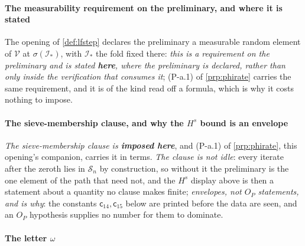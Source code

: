 \paragraph{The measurability requirement on the preliminary, and where it is stated}

The opening of \cref{def:lfstep} declares the preliminary a measurable random element of $\mathcal V$
at $\sigma(\mathcal I_\ast)$, with $\mathcal I_\ast$ the fold fixed there: \emph{this is a requirement on the preliminary and
is stated \textbf{here}, where the preliminary is declared, rather than only inside the verification that
consumes it}; (P-a.1) of \cref{prp:phirate} carries the same requirement, and it is of the kind read off
a formula, which is why it costs nothing to impose.

\paragraph{The sieve-membership clause, and why the $H^{s}$ bound is an envelope}

\emph{The sieve-membership clause is \textbf{imposed here}}, and (P-a.1) of \cref{prp:phirate}, this
opening's companion, carries it in terms. \emph{The clause is not idle}: every iterate after the zeroth
lies in $\mathcal S_n$
by construction, so without it the preliminary is the one element of the path that need not, and the
$H^{s}$ display above is then a statement about a quantity no clause makes finite; \emph{envelopes, not $O_P$
statements, and  is why}: the constants $\mathsf c_{14},\mathsf c_{15}$ below are
printed before the data are seen, and an $O_P$ hypothesis supplies no number for them to dominate.

\paragraph{The letter $\omega$}

